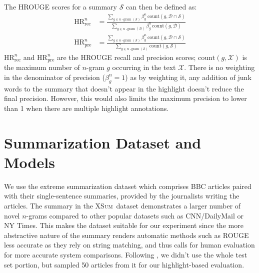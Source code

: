 \documentclass[11pt,a4paper]{article}
\newcommand\xsum{\textsc{XSum}}
\begin{document}
The HROUGE scores for a summary $\mathcal{S}$ can then be defined as:
\begin{align}
    \text{HR}_{\mathrm{rec}}^n &= \frac{\displaystyle\sum_{g \in n\operatorname{-gram}(\mathcal{S})} \beta_g^n\, \text{count}(g, \mathcal{D} \cap \mathcal{S})}{\displaystyle\sum_{g \in n\operatorname{-gram}(\mathcal{D})} \beta_g^n\,\text{count}(g, \mathcal{D})} \\
    \text{HR}_{\mathrm{pre}}^n &= \frac{\displaystyle\sum_{g \in n\operatorname{-gram}(\mathcal{S})} \beta_g^n\, \text{count}(g, \mathcal{D} \cap \mathcal{S})}{\displaystyle\sum_{g \in n\operatorname{-gram}(\mathcal{S})} \text{count}(g, \mathcal{S})}
\end{align}
\noindent $\text{HR}_{\mathrm{rec}}^n$ and $\text{HR}_{\mathrm{pre}}^n$ are the HROUGE recall and precision scores; $\text{count}(g, \mathcal{X})$ is the maximum number of $n$-gram $g$ occurring in the text $\mathcal{X}$. There is no weighting in the denominator of precision ($\beta_g^n = 1$) as by weighting it, any addition of junk words to the summary that doesn't appear in the highlight doesn't reduce the final precision. However, this would also limits the maximum precision to lower than 1 when there are multiple highlight annotations.

\section{Summarization Dataset and Models}
\label{sec:data-models}

We use the extreme summarization dataset \citep[\xsum,][]{narayan18xsum} which comprises BBC articles paired with their single-sentence summaries, provided by the journalists writing the articles. The summary in the \xsum\ dataset demonstrates a larger number of novel $n$-grams compared to other popular datasets such as CNN/DailyMail or NY Times. This makes the dataset suitable for our experiment since the more abstractive nature of the summary renders automatic methods such as ROUGE less accurate as they rely on string matching, and thus calls for human evaluation for more accurate system comparisons. 
Following \citet{narayan18xsum}, we didn't use the whole test set portion, but sampled 50 articles from it for our highlight-based evaluation.  
\end{document}
